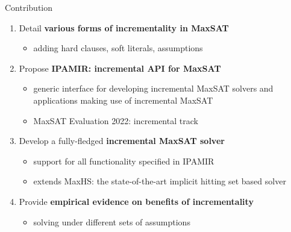\documentclass[aspectratio=169 %
,serif,mathserif]{beamer}
\begin{document}
\begin{frame}{Contribution}
\begin{enumerate}
	\item Detail \textbf{various forms of incrementality in MaxSAT } 
	\begin{itemize}
		\item adding hard clauses, soft literals, assumptions
	\end{itemize} \pause
	\item Propose \textbf{IPAMIR: incremental API for MaxSAT}
	\begin{itemize}
		\item generic interface for developing incremental MaxSAT solvers and applications making use of incremental MaxSAT
		\item MaxSAT Evaluation 2022: incremental track
	\end{itemize} \pause
	\item Develop a fully-fledged \textbf{incremental MaxSAT solver}
	\begin{itemize}
		\item support for all functionality specified in IPAMIR
		\item extends MaxHS: the state-of-the-art implicit hitting set based solver
	\end{itemize} \pause
	\item Provide \textbf{empirical evidence on benefits of incrementality}
	\begin{itemize}
		\item solving under different sets of assumptions
	\end{itemize} 	
\end{enumerate}
\end{frame}
\end{document}
